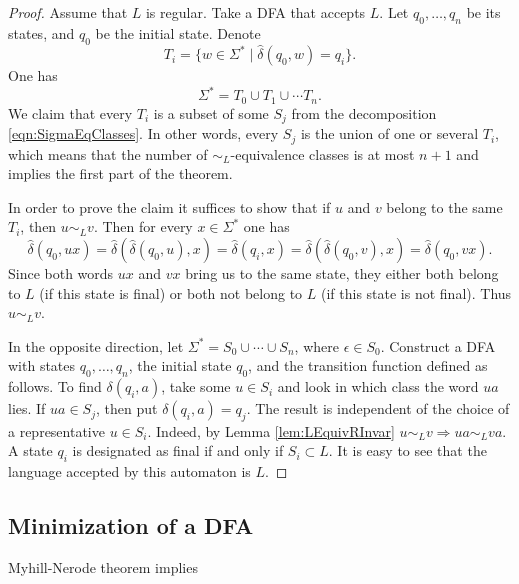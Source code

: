 \begin{page}
\setcounter{section}{4}
\setcounter{subsection}{3}
\setcounter{dfn}{7}
\label{portion:1064}

\begin{proof}
Assume that $L$ is regular.
Take a DFA that accepts $L$.
Let $q_0, \ldots, q_n$ be its states, and $q_0$ be the initial state.
Denote
\[
T_i = \{w \in \Sigma^* \mid \widehat{\delta}(q_0, w) = q_i\}.
\]
One has
\[
\Sigma^* = T_0 \cup T_1 \cup \cdots T_n.
\]
We claim that every $T_i$ is a subset of some $S_j$ from the decomposition \eqref{eqn:SigmaEqClasses}.
In other words, every $S_j$ is the union of one or several $T_i$,
which means that the number of $\sim_L$-equivalence classes is at most $n+1$ and implies the first part of the theorem.

In order to prove the claim it suffices to show that if $u$ and $v$ belong to the same $T_i$, then $u \sim_L v$.
Then for every $x \in \Sigma^*$ one has
\[
\widehat{\delta}(q_0, ux) = \widehat{\delta}(\widehat{\delta}(q_0,u), x) = \widehat{\delta}(q_i, x)
= \widehat{\delta}(\widehat{\delta}(q_0,v), x) = \widehat{\delta}(q_0, vx).
\]
Since both words $ux$ and $vx$ bring us to the same state, they either both belong to $L$ (if this state is final)
or both not belong to $L$ (if this state is not final).
Thus $u \sim_L v$.


In the opposite direction, let $\Sigma^* = S_0 \cup \cdots \cup S_n$, where $\epsilon \in S_0$.
Construct a DFA with states $q_0, \ldots, q_n$, the initial state $q_0$, and the transition function defined as follows.
To find $\delta(q_i, a)$, take some $u \in S_i$ and look in which class the word $ua$ lies.
If $ua \in S_j$, then put $\delta(q_i, a) = q_j$.
The result is independent of the choice of a representative $u \in S_i$.
Indeed, by Lemma \ref{lem:LEquivRInvar} $u \sim_L v \Rightarrow ua \sim_L va$.
A state $q_i$ is designated as final if and only if $S_i \subset L$.
It is easy to see that the language accepted by this automaton is $L$.
\end{proof}



\end{page}

\begin{page}
\setcounter{section}{4}
\setcounter{subsection}{3}
\setcounter{dfn}{7}
\label{portion:1065}

\subsection{Minimization of a DFA}
Myhill-Nerode theorem implies


\end{page}

